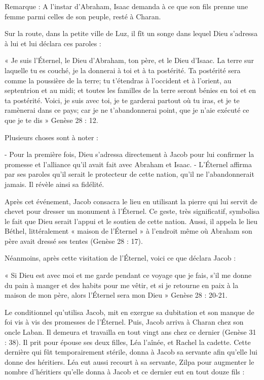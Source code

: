 Remarque : A l'instar d'Abraham, Isaac demanda à ce que son fils prenne une femme parmi celles de son peuple, resté à Charan.

Sur la route, dans la petite ville de Luz, il fît un songe dans lequel Dieu s'adressa à lui et lui déclara ces paroles :

« Je suis l'Éternel, le Dieu d'Abraham, ton père, et le Dieu d'Isaac. La terre sur laquelle tu es couché, je la donnerai à toi et à ta postérité. Ta postérité sera comme la poussière de la terre; tu t'étendras à l'occident et à l'orient, au septentrion et au midi; et toutes les familles de la terre seront bénies en toi et en ta postérité. Voici, je suis avec toi, je te garderai partout où tu iras, et je te ramènerai dans ce pays; car je ne t'abandonnerai point, que je n'aie exécuté ce que je te dis » Genèse 28 : 12.

Plusieurs choses sont à noter :

- Pour la première fois, Dieu s'adressa directement à Jacob pour lui confirmer la promesse et l'alliance qu'il avait fait avec Abraham et Isaac.
- L’Éternel affirma par ses paroles qu'il serait le protecteur de cette nation, qu'il ne l'abandonnerait jamais. Il révèle ainsi sa fidélité.

Après cet événement, Jacob consacra le lieu en utilisant la pierre qui lui servit de chevet pour dresser un monument à l’Éternel. Ce geste, très significatif, symbolisa le fait que Dieu serait l'appui et le soutien de cette nation. Aussi, il appela le lieu Béthel, littéralement « maison de l’Éternel » à l'endroit même où Abraham son père avait dressé ses tentes (Genèse 28 : 17).

Néanmoins, après cette visitation de l’Éternel, voici ce que déclara Jacob :

« Si Dieu est avec moi et me garde pendant ce voyage que je fais, s'il me donne du pain à manger et des habits pour me vêtir, et si je retourne en paix à la maison de mon père, alors l'Éternel sera mon Dieu » Genèse 28 : 20-21.

Le conditionnel qu'utilisa Jacob, mit en exergue sa dubitation et son manque de foi vis à vis des promesses de l’Éternel.
Puis, Jacob arriva à Charan chez son oncle Laban. Il demeura et travailla en tout vingt ans chez ce dernier (Genèse 31 : 38). Il prit pour épouse ses deux filles, Léa l'aînée, et Rachel la cadette. Cette dernière qui fût temporairement stérile, donna à Jacob sa servante afin qu'elle lui donne des héritiers. Léa eut aussi recourt à sa servante, Zilpa pour augmenter le nombre d’héritiers qu'elle donna à Jacob et ce dernier eut en tout douze fils :

